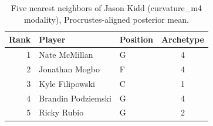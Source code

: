 \begin{table}[htbp]
  \centering\small
  \begin{tabular}{rllc}
    \toprule
    Rank & Player & Position & Archetype \\
    \midrule
    1 & Nate McMillan & G & 4 \\
    2 & Jonathan Mogbo & F & 4 \\
    3 & Kyle Filipowski & C & 1 \\
    4 & Brandin Podziemski & G & 4 \\
    5 & Ricky Rubio & G & 2 \\
    \bottomrule
  \end{tabular}
  \caption{Five nearest neighbors of Jason Kidd (curvature_m4 modality), Procrustes-aligned posterior mean.}
  \label{tab:Jason_Kidd_neighbors_curvature_m4}
\end{table}

